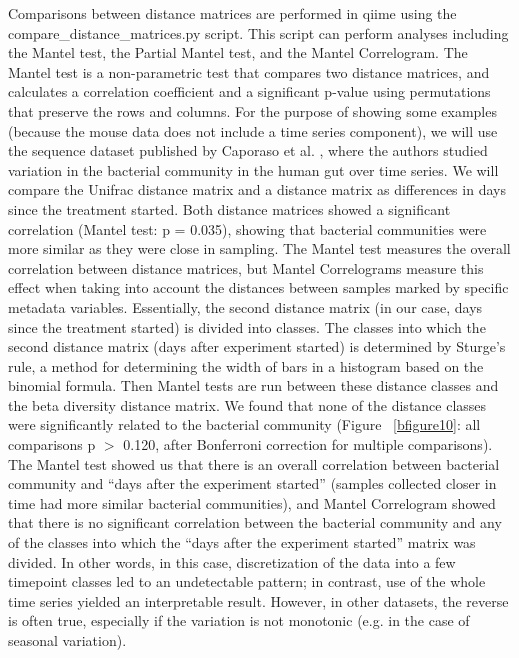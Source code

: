 Comparisons between distance matrices are performed in \gls{qiime} using the
compare\_distance\_matrices.py script. This script can perform analyses including
the Mantel test, the Partial Mantel test, and the Mantel Correlogram. The Mantel
test is a non-parametric test that compares two distance matrices, and calculates
a correlation coefficient and a significant p-value using permutations that preserve
the rows and columns. For the purpose of showing some examples (because the mouse
data does not include a time series component), we will use the sequence dataset published
by Caporaso et al. \cite{Caporaso2011}, where the authors studied variation in the
bacterial community in the human gut over time series. We will compare the Unifrac
distance matrix and a distance matrix as differences in days since the treatment started.
Both distance matrices showed a significant correlation (Mantel test: p = 0.035),
showing that bacterial communities were more similar as they were close in sampling.
The Mantel test measures the overall correlation between distance matrices, but Mantel Correlograms
measure this effect when taking into account the distances between samples marked by specific
metadata variables. Essentially, the second distance matrix (in our case, days since the
treatment started) is divided into classes. The classes into which the second distance
matrix (days after experiment started) is determined by Sturge's rule, a method for
determining the width of bars in a histogram based on the binomial formula. Then Mantel
tests are run between these distance classes and the beta diversity distance matrix.
We found that none of the distance classes were significantly related to the bacterial
community (Figure ~\ref{bfigure10}: all comparisons p $>$ 0.120, after Bonferroni correction
for multiple comparisons). The Mantel test showed us that there is an overall correlation between
bacterial community and “days after the experiment started” (samples collected closer in
time had more similar bacterial communities), and Mantel Correlogram showed that there is
no significant correlation between the bacterial community and any of the classes into which
the “days after the experiment started” matrix was divided. In other words, in this
case, discretization of the data into a few timepoint classes led to an undetectable pattern;
in contrast, use of the whole time series yielded an interpretable result. However, in other
datasets, the reverse is often true, especially if the variation is not monotonic
(e.g. in the case of seasonal variation).

